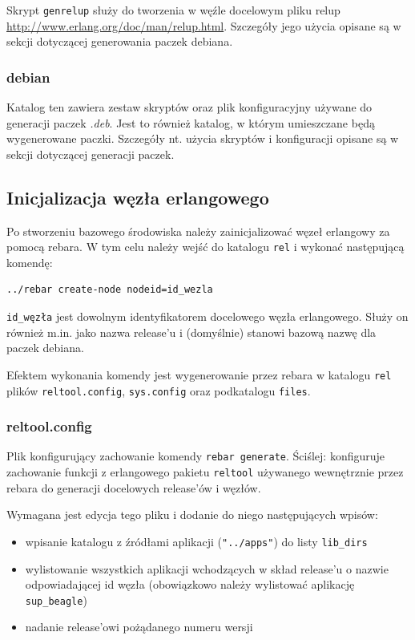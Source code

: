 \documentclass[polish,12pt]{aghthesis}
\begin{document}
Skrypt \texttt{genrelup} służy do tworzenia w węźle docelowym pliku relup \url{http://www.erlang.org/doc/man/relup.html}. Szczegóły jego użycia opisane są w sekcji dotyczącej generowania paczek debiana.
\subsubsection{debian}
Katalog ten zawiera zestaw skryptów oraz plik konfiguracyjny używane do generacji paczek \emph{.deb}. Jest to również katalog, w którym umieszczane będą wygenerowane paczki. Szczegóły nt. użycia skryptów i konfiguracji opisane są w sekcji dotyczącej generacji paczek.

\subsection{Inicjalizacja węzła erlangowego}
Po stworzeniu bazowego środowiska należy zainicjalizować węzeł erlangowy za pomocą rebara. W tym celu należy wejść do katalogu \texttt{rel} i wykonać następującą komendę:
\begin{lstlisting}
../rebar create-node nodeid=id_wezla
\end{lstlisting}

\texttt{id\_węzła} jest dowolnym identyfikatorem docelowego węzła erlangowego. Służy on również m.in. jako nazwa release'u i (domyślnie) stanowi bazową nazwę dla paczek debiana.

Efektem wykonania komendy jest wygenerowanie przez rebara w katalogu \texttt{rel} plików \texttt{reltool.config}, \texttt{sys.config} oraz podkatalogu \texttt{files}.

\subsubsection{reltool.config}

Plik konfigurujący zachowanie komendy \texttt{rebar generate}. Ściślej: konfiguruje zachowanie funkcji z erlangowego pakietu \texttt{reltool} używanego wewnętrznie przez rebara do generacji docelowych release'ów i węzłów.

Wymagana jest edycja tego pliku i dodanie do niego następujących wpisów:
\begin{itemize}
\item wpisanie katalogu z źródłami aplikacji (\texttt{"../apps"}) do listy \texttt{lib\_dirs}
\item wylistowanie wszystkich aplikacji wchodzących w skład release'u o nazwie odpowiadającej id węzła (obowiązkowo należy wylistować aplikację \texttt{sup\_beagle})
\item nadanie release'owi pożądanego numeru wersji
\end{itemize}
\end{document}
